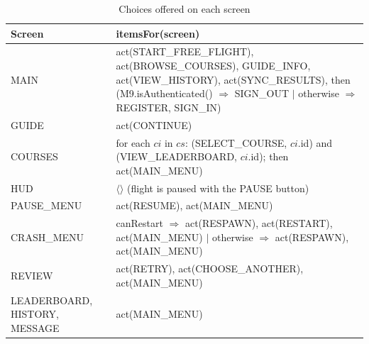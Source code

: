 \documentclass[12pt, titlepage]{article}
\begin{document}
\begin{table}[h!]
\centering
\renewcommand{\arraystretch}{1.15}
\begin{tabularx}{\textwidth}{>{\raggedright\arraybackslash}p{3.5cm}
>{\raggedright\arraybackslash}X}
\toprule
\textbf{Screen} & \textbf{itemsFor(screen)} \\
\midrule
MAIN & act(START\_FREE\_FLIGHT), act(BROWSE\_COURSES), GUIDE\_INFO,
act(VIEW\_HISTORY), act(SYNC\_RESULTS), then (M9.isAuthenticated()
$\Rightarrow$ SIGN\_OUT $|$ otherwise $\Rightarrow$ REGISTER, SIGN\_IN)\\
GUIDE & act(CONTINUE)\\
COURSES & for each $ci$ in $cs$: (SELECT\_COURSE, $ci$.id) and
(VIEW\_LEADERBOARD, $ci$.id); then act(MAIN\_MENU)\\
HUD & $\langle\rangle$ (flight is paused with the PAUSE button)\\
PAUSE\_MENU & act(RESUME), act(MAIN\_MENU)\\
CRASH\_MENU & canRestart $\Rightarrow$ act(RESPAWN), act(RESTART),
act(MAIN\_MENU) $|$ otherwise $\Rightarrow$ act(RESPAWN), act(MAIN\_MENU)\\
REVIEW & act(RETRY), act(CHOOSE\_ANOTHER), act(MAIN\_MENU)\\
LEADERBOARD, HISTORY, MESSAGE & act(MAIN\_MENU)\\
\bottomrule
\end{tabularx}
\caption{Choices offered on each screen}
\label{TblM3Items}
\end{table}
\end{document}
